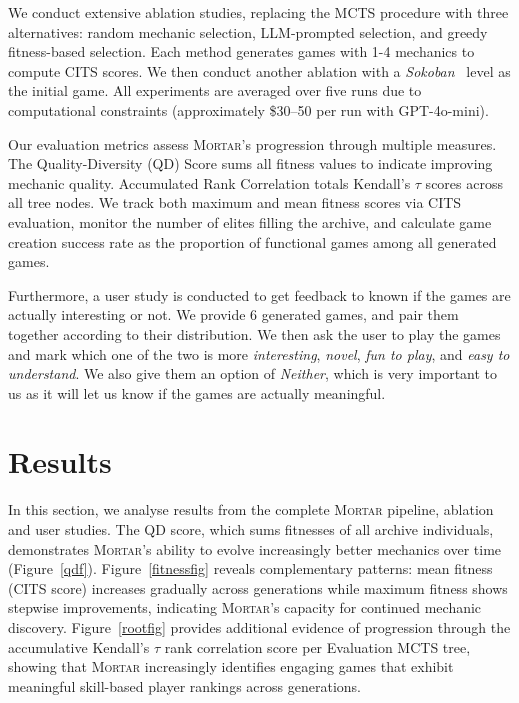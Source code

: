\documentclass{article} %
\newcommand{\name}{\textsc{Mortar}}
\begin{document}
We conduct extensive ablation studies, replacing the MCTS procedure with three alternatives: random mechanic selection, LLM-prompted selection, and greedy fitness-based selection. Each method generates games with 1-4 mechanics to compute CITS scores. We then conduct another ablation with a \textit{Sokoban}~\citep{murase1996automatic} level as the initial game. All experiments are averaged over five runs due to computational constraints (approximately \$30--50 per run with GPT-4o-mini).

Our evaluation metrics assess \name{}'s progression through multiple measures. The Quality-Diversity (QD) Score sums all fitness values to indicate improving mechanic quality. Accumulated Rank Correlation totals Kendall's $\tau$ scores across all tree nodes. We track both maximum and mean fitness scores via CITS evaluation, monitor the number of elites filling the archive, and calculate game creation success rate as the proportion of functional games among all generated games.

Furthermore, a user study is conducted to get feedback to known if the games are actually interesting or not. We provide 6 generated games, and pair them together according to their distribution. We then ask the user to play the games and mark which one of the two is more \textit{interesting}, \textit{novel}, \textit{fun to play}, and \textit{easy to understand}. We also give them an option of \textit{Neither}, which is very important to us as it will let us know if the games are actually meaningful. 

\section{Results}

In this section, we analyse results from the complete \name{} pipeline, ablation and user studies. The QD score, which sums fitnesses of all archive individuals, demonstrates \name{}'s ability to evolve increasingly better mechanics over time (Figure~\ref{qdf}). Figure~\ref{fitnessfig} reveals complementary patterns: mean fitness (CITS score) increases gradually across generations while maximum fitness shows stepwise improvements, indicating \name{}'s capacity for continued mechanic discovery. Figure~\ref{rootfig} provides additional evidence of progression through the accumulative Kendall's $\tau$ rank correlation score per Evaluation MCTS tree, showing that \name{} increasingly identifies engaging games that exhibit meaningful skill-based player rankings across generations.
\end{document}
